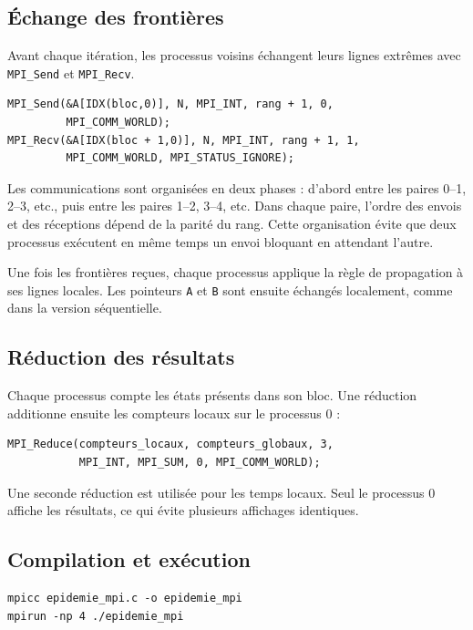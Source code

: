 \documentclass[a4paper,12pt]{article}
\begin{document}
\subsection{Échange des frontières}

Avant chaque itération, les processus voisins échangent leurs lignes extrêmes
avec \texttt{MPI\_Send} et \texttt{MPI\_Recv}.

\begin{lstlisting}
MPI_Send(&A[IDX(bloc,0)], N, MPI_INT, rang + 1, 0,
         MPI_COMM_WORLD);
MPI_Recv(&A[IDX(bloc + 1,0)], N, MPI_INT, rang + 1, 1,
         MPI_COMM_WORLD, MPI_STATUS_IGNORE);
\end{lstlisting}

Les communications sont organisées en deux phases : d'abord entre les paires
0--1, 2--3, etc., puis entre les paires 1--2, 3--4, etc. Dans chaque paire,
l'ordre des envois et des réceptions dépend de la parité du rang. Cette
organisation évite que deux processus exécutent en même temps un envoi bloquant
en attendant l'autre.

Une fois les frontières reçues, chaque processus applique la règle de
propagation à ses lignes locales. Les pointeurs \texttt{A} et \texttt{B} sont
ensuite échangés localement, comme dans la version séquentielle.

\subsection{Réduction des résultats}

Chaque processus compte les états présents dans son bloc. Une réduction
additionne ensuite les compteurs locaux sur le processus 0 :

\begin{lstlisting}
MPI_Reduce(compteurs_locaux, compteurs_globaux, 3,
           MPI_INT, MPI_SUM, 0, MPI_COMM_WORLD);
\end{lstlisting}

Une seconde réduction est utilisée pour les temps locaux. Seul le processus 0
affiche les résultats, ce qui évite plusieurs affichages identiques.

\subsection{Compilation et exécution}

\begin{lstlisting}[numbers=none]
mpicc epidemie_mpi.c -o epidemie_mpi
mpirun -np 4 ./epidemie_mpi
\end{lstlisting}
\end{document}
